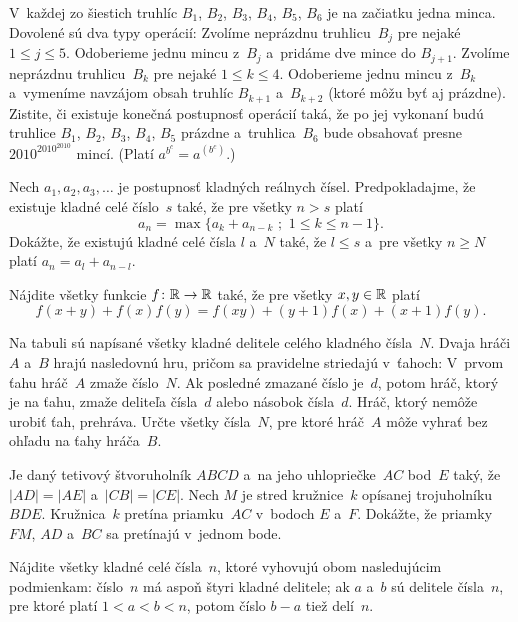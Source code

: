 {%
V~každej zo šiestich truhlíc $B_1$, $B_2$, $B_3$, $B_4$, $B_5$, $B_6$
je na začiatku jedna minca. Dovolené sú dva typy operácií:
  Zvolíme neprázdnu truhlicu~$B_j$ pre nejaké $1 \le j \le 5$.
    Odoberieme jednu mincu z~$B_j$ a~pridáme dve mince do $B_{j+1}$.
  Zvolíme neprázdnu truhlicu~$B_k$ pre nejaké $1 \le k \le 4$.
    Odoberieme jednu mincu z~$B_k$ a~vymeníme navzájom obsah truhlíc $B_{k+1}$ a~$B_{k+2}$ (ktoré môžu byť aj prázdne).
\noindent
Zistite, či existuje konečná postupnosť operácií taká, že po jej vykonaní budú truhlice
$B_1$, $B_2$, $B_3$, $B_4$, $B_5$ prázdne a~truhlica~$B_6$ bude obsahovať presne
$2010^{2010^{2010}}$ mincí.  (Platí $a^{b^{c}}=a^{(b^{c})}$.)}

{%
Nech $a_1,a_2,a_3,\dots$ je postupnosť kladných reálnych čísel. Predpokladajme, že
existuje kladné celé číslo~$s$ také, že pre všetky $n>s$ platí
$$
  a_n=\max\{a_k+a_{n-k} \,\,;\,\, 1\le k\leq n-1\}.
$$
Dokážte, že existujú kladné celé čísla $l$ a~$N$ také, že $l\le s$ a~pre všetky $n\ge N$ platí $a_n=a_l+a_{n-l}$.}

{%
Nájdite všetky funkcie $f\colon\Bbb R\to\Bbb R$ také, že pre všetky $x,y\in\Bbb R$ platí
$$
f(x+y) + f(x)f(y) = f(xy) + (y+1)f(x) + (x+1)f(y).
$$}

{%
Na tabuli sú napísané všetky kladné delitele celého kladného čísla~$N$. Dvaja hráči $A$ a~$B$ hrajú nasledovnú hru, pričom sa pravidelne striedajú v~ťahoch: V~prvom ťahu hráč~$A$ zmaže číslo~$N$. Ak posledné zmazané číslo je~$d$, potom hráč, ktorý je na ťahu, zmaže deliteľa čísla~$d$ alebo násobok čísla~$d$. Hráč, ktorý nemôže urobiť ťah, prehráva.
Určte všetky čísla~$N$, pre ktoré hráč~$A$ môže vyhrať bez ohľadu na ťahy hráča~$B$.}

{%
Je daný tetivový štvoruholník $ABCD$ a~na jeho uhlopriečke~$AC$ bod~$E$ taký, že $|AD|=|AE|$ a~$|CB|=|CE|$.
Nech $M$ je stred kružnice~$k$ opísanej trojuholníku $BDE$.
Kružnica~$k$ pretína priamku~$AC$ v~bodoch $E$ a~$F$.
Dokážte, že priamky $FM$, $AD$ a~$BC$ sa pretínajú v~jednom bode.}

{%
Nájdite všetky kladné celé čísla~$n$, ktoré vyhovujú obom nasledujúcim podmienkam:
číslo~$n$ má aspoň štyri kladné delitele;
ak $a$ a~$b$ sú delitele čísla~$n$, pre ktoré platí $1 < a < b < n$, potom číslo $b - a$ tiež delí~$n$.
\endgraf
}


